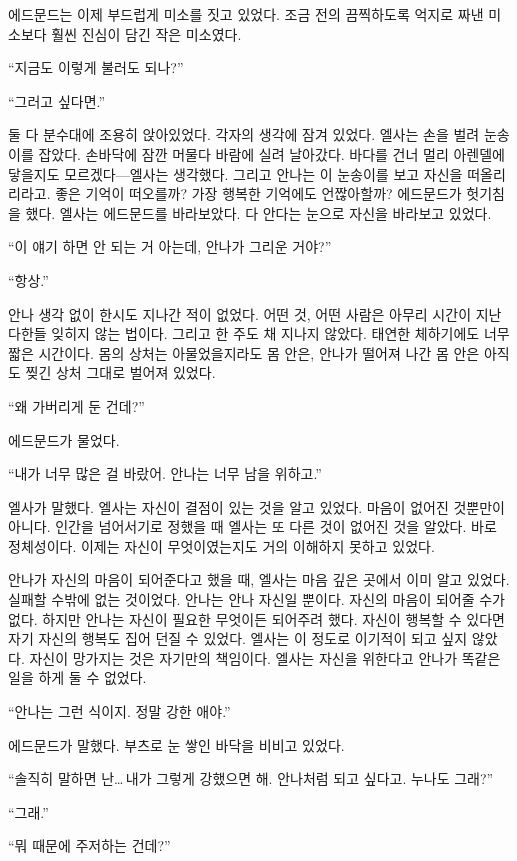 에드문드는 이제 부드럽게 미소를 짓고 있었다. 조금 전의 끔찍하도록 억지로 짜낸 미소보다 훨씬 진심이 담긴 작은 미소였다.

``지금도 이렇게 불러도 되나?''

``그러고 싶다면.''

둘 다 분수대에 조용히 앉아있었다. 각자의 생각에 잠겨 있었다. 엘사는 손을 벌려 눈송이를 잡았다. 손바닥에 잠깐 머물다 바람에 실려 날아갔다. 바다를 건너 멀리 아렌델에 닿을지도 모르겠다—엘사는 생각했다. 그리고 안나는 이 눈송이를 보고 자신을 떠올리리라고. 좋은 기억이 떠오를까? 가장 행복한 기억에도 언짢아할까? 에드문드가 헛기침을 했다. 엘사는 에드문드를 바라보았다. 다 안다는 눈으로 자신을 바라보고 있었다.

``이 얘기 하면 안 되는 거 아는데, 안나가 그리운 거야?''

``항상.''

안나 생각 없이 한시도 지나간 적이 없었다. 어떤 것, 어떤 사람은 아무리 시간이 지난다한들 잊히지 않는 법이다. 그리고 한 주도 채 지나지 않았다. 태연한 체하기에도 너무 짧은 시간이다. 몸의 상처는 아물었을지라도 몸 안은, 안나가 떨어져 나간 몸 안은 아직도 찢긴 상처 그대로 벌어져 있었다.

``왜 가버리게 둔 건데?''

에드문드가 물었다.

``내가 너무 많은 걸 바랐어. 안나는 너무 남을 위하고.''

엘사가 말했다. 엘사는 자신이 결점이 있는 것을 알고 있었다. 마음이 없어진 것뿐만이 아니다. 인간을 넘어서기로 정했을 때 엘사는 또 다른 것이 없어진 것을 알았다. 바로 정체성이다. 이제는 자신이 무엇이였는지도 거의 이해하지 못하고 있었다.

안나가 자신의 마음이 되어준다고 했을 때, 엘사는 마음 깊은 곳에서 이미 알고 있었다. 실패할 수밖에 없는 것이었다. 안나는 안나 자신일 뿐이다. 자신의 마음이 되어줄 수가 없다. 하지만 안나는 자신이 필요한 무엇이든 되어주려 했다. 자신이 행복할 수 있다면 자기 자신의 행복도 집어 던질 수 있었다. 엘사는 이 정도로 이기적이 되고 싶지 않았다. 자신이 망가지는 것은 자기만의 책임이다. 엘사는 자신을 위한다고 안나가 똑같은 일을 하게 둘 수 없었다.

``안나는 그런 식이지. 정말 강한 애야.''

에드문드가 말했다. 부츠로 눈 쌓인 바닥을 비비고 있었다.

``솔직히 말하면 난\ldots\,내가 그렇게 강했으면 해. 안나처럼 되고 싶다고. 누나도 그래?''

``그래.''

``뭐 때문에 주저하는 건데?''

